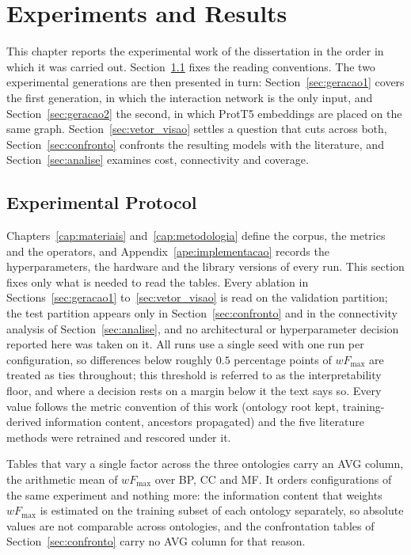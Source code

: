 \documentclass[Ingles]{ic-tese-v3}
\begin{document}
\chapter{Experiments and Results}
\label{cap:resultados}

This chapter reports the experimental work of the dissertation in the order in which it
was carried out. Section~\ref{sec:expprotocolo} fixes the reading conventions. The two
experimental generations are then presented in turn: Section~\ref{sec:geracao1} covers
the first generation, in which the interaction network is the only input, and
Section~\ref{sec:geracao2} the second, in which ProtT5 embeddings are placed on the same
graph. Section~\ref{sec:vetor_visao} settles a question that cuts across both,
Section~\ref{sec:confronto} confronts the resulting models with the literature, and
Section~\ref{sec:analise} examines cost, connectivity and coverage.


\section{Experimental Protocol}
\label{sec:expprotocolo}

Chapters~\ref{cap:materiais} and~\ref{cap:metodologia} define the corpus, the metrics and
the operators, and Appendix~\ref{ape:implementacao} records the hyperparameters, the
hardware and the library versions of every run. This section fixes only what is needed to
read the tables. Every ablation in Sections~\ref{sec:geracao1} to~\ref{sec:vetor_visao} is
read on the validation partition; the test partition appears only in
Section~\ref{sec:confronto} and in the connectivity analysis of Section~\ref{sec:analise},
and no architectural or hyperparameter decision reported here was taken on it. All runs use
a single seed with one run per configuration, so differences below roughly $0.5$ percentage
points of $wF_{\max}$ are treated as ties throughout; this threshold is referred to as the
interpretability floor, and where a decision rests on a margin below it the text says so. Every value follows the metric convention of this work
(ontology root kept, training-derived information content, ancestors propagated) and the five
literature methods were retrained and rescored under it.

Tables that vary a single factor across the three ontologies carry an AVG column, the
arithmetic mean of $wF_{\max}$ over BP, CC and MF. It orders configurations of the same
experiment and nothing more: the information content that weights $wF_{\max}$ is estimated
on the training subset of each ontology separately, so absolute values are not comparable
across ontologies, and the confrontation tables of Section~\ref{sec:confronto} carry no AVG
column for that reason.
\end{document}
